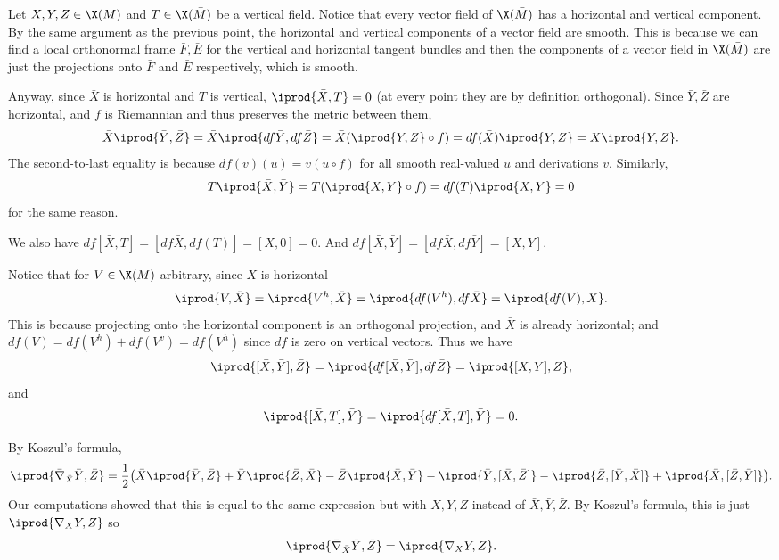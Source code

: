     \item Let $X,Y,Z\in\X(M)$ and $T\in\X(\bar M)$ be a vertical field.
    Notice that every vector field of $\X(\bar M)$ has a horizontal and vertical component.
    By the same argument as the previous point, the horizontal and vertical components of a vector field are smooth.
    This is because we can find a local orthonormal frame $\bar F,\bar E$ for the vertical and horizontal tangent bundles and then the components of a vector field in $\X(\bar M)$
    are just the projections onto $\bar F$ and $\bar E$ respectively, which is smooth.

    Anyway, since $\bar X$ is horizontal and $T$ is vertical, $\iprod{\bar X,T}=0$ (at every point they are by definition orthogonal).
    Since $\bar Y,\bar Z$ are horizontal, and $f$ is Riemannian and thus preserves the metric between them,
    $$ \bar X\iprod{\bar Y,\bar Z} = \bar X\iprod{df\bar Y,df\bar Z} = \bar X(\iprod{Y,Z}\circ f) = df(\bar X)\iprod{Y,Z} = X\iprod{Y,Z} . $$
    The second-to-last equality is because $df(v)(u)=v(u\circ f)$ for all smooth real-valued $u$ and derivations $v$.
    Similarly,
    $$ T\iprod{\bar X,\bar Y} = T(\iprod{X,Y}\circ f) = df(T)\iprod{X,Y} = 0 $$
    for the same reason.

    We also have $df[\bar X,T]=[df\bar X,df(T)]=[X,0]=0$.
    And $df[\bar X,\bar Y]=[df\bar X,df\bar Y]=[X,Y]$.

    Notice that for $V\in\X(\bar M)$ arbitrary, since $\bar X$ is horizontal
    $$ \iprod{V,\bar X} = \iprod{V^h,\bar X} = \iprod{df(V^h),df\bar X} = \iprod{df(V),X} . $$
    This is because projecting onto the horizontal component is an orthogonal projection, and $\bar X$ is already horizontal; and $df(V)=df(V^h)+df(V^v)=df(V^h)$
    since $df$ is zero on vertical vectors.
    Thus we have
    $$ \iprod{[\bar X,\bar Y],\bar Z} = \iprod{df[\bar X,\bar Y],df\bar Z} = \iprod{[X,Y],Z} , $$
    and
    $$ \iprod{[\bar X,T],\bar Y} = \iprod{df[\bar X,T],\bar Y} = 0 . $$

    By Koszul's formula,
    $$ \iprod{\bar\nabla_{\bar X}\bar Y,\bar Z} = \frac12\bigl(\bar X\iprod{\bar Y,\bar Z} + \bar Y\iprod{\bar Z,\bar X} - \bar Z\iprod{\bar X,\bar Y}
        - \iprod{\bar Y,[\bar X,\bar Z]} - \iprod{\bar Z,[\bar Y,\bar X]} + \iprod{\bar X,[\bar Z,\bar Y]}\bigr) . $$
    Our computations showed that this is equal to the same expression but with $X,Y,Z$ instead of $\bar X,\bar Y,\bar Z$.
    By Koszul's formula, this is just $\iprod{\nabla_XY,Z}$ so
    $$ \iprod{\bar\nabla_{\bar X}\bar Y,\bar Z} = \iprod{\nabla_XY,Z} . $$

